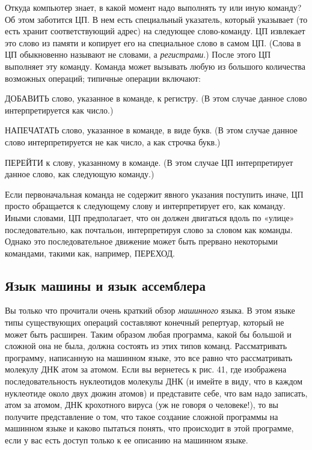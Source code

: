 \documentclass[../main.tex]{subfiles}
\begin{document}
Откуда компьютер знает, в какой момент надо выполнять ту или иную команду? Об этом заботится ЦП\@. В нем есть специальный указатель, который указывает (то есть хранит соответствующий адрес) на следующее слово-команду. ЦП извлекает это слово из памяти и копирует его на специальное слово в самом ЦП\@. (Слова в ЦП обыкновенно называют не словами, а \emph{регистрами}.) После этого ЦП выполняет эту команду. Команда может вызывать любую из большого количества возможных операций; типичные операции включают:

ДОБАВИТЬ слово, указанное в команде, к регистру. (В этом случае данное слово интерпретируется как число.)

НАПЕЧАТАТЬ слово, указанное в команде, в виде букв. (В этом случае данное слово интерпретируется не как число, а как строчка букв.)

ПЕРЕЙТИ к слову, указанному в команде. (В этом случае ЦП интерпретирует данное слово, как следующую команду.)

Если первоначальная команда не содержит явного указания поступить иначе, ЦП просто обращается к следующему слову и интерпретирует его, как команду. Иными словами, ЦП предполагает, что он должен двигаться вдоль по «улице» последовательно, как почтальон, интерпретируя слово за словом как команды. Однако это последовательное движение может быть прервано некоторыми командами, такими как, например, ПЕРЕХОД.


\subsection{Язык машины и язык ассемблера}

Вы только что прочитали очень краткий обзор \emph{машинного} языка. В этом языке типы существующих операций составляют конечный репертуар, который не может быть расширен. Таким образом любая программа, какой бы большой и сложной она не была, должна состоять из этих типов команд. Рассматривать программу, написанную на машинном языке, это все равно что рассматривать молекулу ДНК атом за атомом. Если вы вернетесь к рис. 41, где изображена последовательность нуклеотидов молекулы ДНК (и имейте в виду, что в каждом нуклеотиде около двух дюжин атомов) и представите себе, что вам надо записать, атом за атомом, ДНК крохотного вируса (уж не говоря о человеке!), то вы получите представление о том, что такое создание сложной программы на машинном языке и каково пытаться понять, что происходит в этой программе, если у вас есть доступ только к ее описанию на машинном языке.
\end{document}
